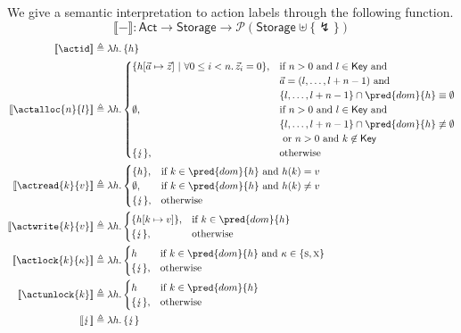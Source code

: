We give a semantic interpretation to action labels through the following function.
\[
\llbracket - \rrbracket : \mathsf{Act} \rightarrow \mathsf{Storage} \rightarrow \mathcal{P}(\mathsf{Storage} \uplus \{ \lightning \})
\]
\begin{align*}
\llbracket \actid \rrbracket &\triangleq \lambda h \ldotp \{h\} \\
\llbracket \actalloc{n}{l} \rrbracket &\triangleq \lambda h \ldotp
\begin{cases}
\{ h[\vec{a} \mapsto \vec{z}]\ |\ \forall 0 \leq i < n \ldotp \vec{z}_i = 0 \},
&
\text{if } n > 0 \text{ and } l \in \mathsf{Key} \text{ and } \\
& \vec{a} = (l, \ldots, l + n - 1) \text{ and } \\
& \{ l, \ldots, l + n - 1 \} \cap \pred{dom}{h} \equiv \emptyset \\
\emptyset, & \text{if } n > 0 \text{ and } l \in \mathsf{Key} \text{ and } \\
& \{ l, \ldots, l + n - 1 \} \cap \pred{dom}{h} \not\equiv \emptyset \\
& \text{ or } n > 0 \text{ and } k \not\in \mathsf{Key} \\
\{ \lightning \}, & \text{otherwise}
\end{cases} \\
\llbracket \actread{k}{v} \rrbracket &\triangleq \lambda h \ldotp
\begin{cases}
\{ h \}, & \text{if } k \in \pred{dom}{h} \text{ and } h(k) = v \\
\emptyset, & \text{if } k \in \pred{dom}{h} \text{ and } h(k) \neq v \\
\{ \lightning \}, & \text{otherwise}
\end{cases} \\
\llbracket \actwrite{k}{v} \rrbracket &\triangleq \lambda h \ldotp
\begin{cases}
\{ h[k \mapsto v] \}, & \text{if } k \in \pred{dom}{h} \\
\{ \lightning \}, & \text{otherwise}
\end{cases} \\
\llbracket \actlock{k}{\kappa} \rrbracket &\triangleq \lambda h \ldotp
\begin{cases}
h & \text{if } k \in \pred{dom}{h} \text{ and } \kappa \in \{ \textsc{s}, \textsc{x} \} \\
\{ \lightning \}, & \text{otherwise}
\end{cases} \\
\llbracket \actunlock{k} \rrbracket &\triangleq \lambda h \ldotp
\begin{cases}
h & \text{if } k \in \pred{dom}{h} \\
\{ \lightning \}, & \text{otherwise}
\end{cases} \\
\llbracket \lightning \rrbracket &\triangleq \lambda h \ldotp \{ \lightning \}
\end{align*}

